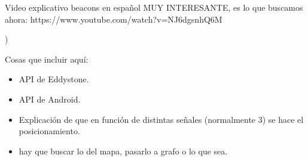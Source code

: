 Video explicativo beacons en español MUY INTERESANTE, es lo que buscamos ahora: https://www.youtube.com/watch?v=NJ6dgsnhQ6M

)

Cosas que incluir aquí:

\begin{itemize}
	\item API de Eddystone.
	\item API de Android.
	\item Explicación de que en función de distintas señales (normalmente 3) se hace el posicionamiento.
	\item hay que buscar lo del mapa, pasarlo a grafo o lo que sea.
\end{itemize}



 